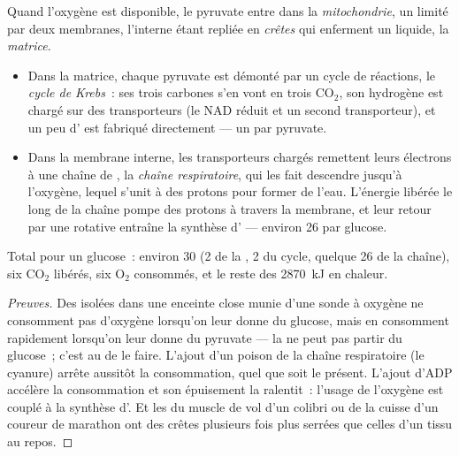 \begin{proposition}\label{prop:g12:respiration-fermentation:mitochondrion}
Quand l'oxygène est disponible, le pyruvate entre dans la
\emph{mitochondrie}, un  limité par deux
membranes, l'interne étant repliée en \emph{crêtes} qui enferment un
liquide, la \emph{matrice}.
\begin{itemize}
  \item Dans la matrice, chaque pyruvate est démonté par un cycle de
        réactions, le \emph{cycle de Krebs}~:
        ses trois carbones s'en vont en trois $\mathrm{CO_2}$, son
        hydrogène est chargé sur des transporteurs (le NAD réduit et
        un second transporteur), et un peu d' est fabriqué
        directement --- un par pyruvate.
  \item Dans la membrane interne, les transporteurs chargés remettent
        leurs électrons à une chaîne de , la \emph{chaîne
        respiratoire}, qui les fait descendre jusqu'à l'oxygène,
        lequel s'unit à des protons pour former de l'eau. L'énergie
        libérée le long de la chaîne pompe des protons à travers la
        membrane, et leur retour par une  rotative entraîne la
        synthèse d' --- environ 26 par glucose.
\end{itemize}
Total pour un glucose~: environ 30  (2 de la , 2 du cycle,
quelque 26 de la chaîne), six $\mathrm{CO_2}$ libérés, six
$\mathrm{O_2}$ consommés, et le reste des \qty{2870}{kJ} en chaleur.
\end{proposition}
\begin{proof}[Preuves]
Des  isolées dans une enceinte close munie d'une sonde à
oxygène ne consomment pas d'oxygène lorsqu'on leur donne du glucose,
mais en consomment rapidement lorsqu'on leur donne du
pyruvate --- la  ne peut pas partir du glucose~; c'est au
 de le faire. L'ajout d'un poison de la chaîne respiratoire
(le cyanure) arrête aussitôt la consommation, quel que soit le
 présent. L'ajout d'ADP accélère la consommation et son
épuisement la ralentit~: l'usage de l'oxygène est couplé à la synthèse
d'. Et les  du muscle de vol d'un colibri ou de la
cuisse d'un coureur de marathon ont des crêtes plusieurs fois plus
serrées que celles d'un tissu au repos.
\end{proof}

